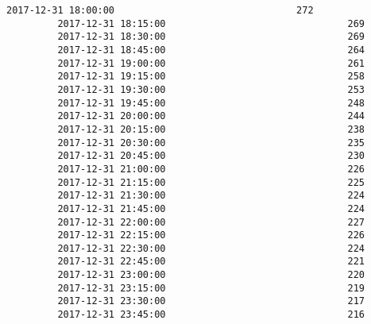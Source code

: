 \documentclass[11pt]{article}
\begin{document}
\begin{Verbatim}[commandchars=\\\{\}]
         2017-12-31 18:00:00                                272   
         2017-12-31 18:15:00                                269   
         2017-12-31 18:30:00                                269   
         2017-12-31 18:45:00                                264   
         2017-12-31 19:00:00                                261   
         2017-12-31 19:15:00                                258   
         2017-12-31 19:30:00                                253   
         2017-12-31 19:45:00                                248   
         2017-12-31 20:00:00                                244   
         2017-12-31 20:15:00                                238   
         2017-12-31 20:30:00                                235   
         2017-12-31 20:45:00                                230   
         2017-12-31 21:00:00                                226   
         2017-12-31 21:15:00                                225   
         2017-12-31 21:30:00                                224   
         2017-12-31 21:45:00                                224   
         2017-12-31 22:00:00                                227   
         2017-12-31 22:15:00                                226   
         2017-12-31 22:30:00                                224   
         2017-12-31 22:45:00                                221   
         2017-12-31 23:00:00                                220   
         2017-12-31 23:15:00                                219   
         2017-12-31 23:30:00                                217   
         2017-12-31 23:45:00                                216   
         

\end{Verbatim}
\end{document}
